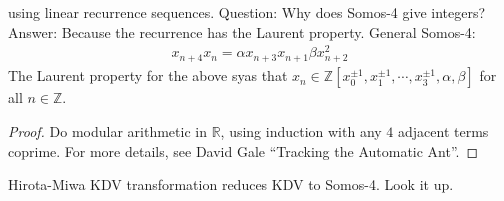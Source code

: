\documentclass[12pt,reqno]{amsart}
\numberwithin{equation}{section}  %
\newcommand{\rr}{\mathbb{R}}
\newcommand{\zz}{\mathbb{Z}}
\begin{document}
using linear recurrence sequences.
Question: Why does Somos-4 give integers? Answer: Because the recurrence has the
Laurent property. General Somos-4:
%
%
\begin{equation*}
    \begin{split}
	x_{n+4}x_{n} = \alpha x_{n+3} x_{n+1} \beta x_{n+2}^{2}
    \end{split}
\end{equation*}
%
%
The Laurent property for the above syas that $x_{n} \in \zz[x_{0}^{\pm 1},
x_{1}^{\pm 1}, \cdots, x_{3}^{\pm 1}, \alpha, \beta ]$ for all $n \in \zz$. 
%
%
\begin{proof}
    Do modular arithmetic in $\rr$, using induction with any $4$ adjacent terms
    coprime. For more details, see David Gale ``Tracking the Automatic Ant''.
\end{proof}
%
%
Hirota-Miwa KDV transformation reduces KDV to Somos-4. Look it up.
%
%
%
%
%
%
%
%
\end{document}

